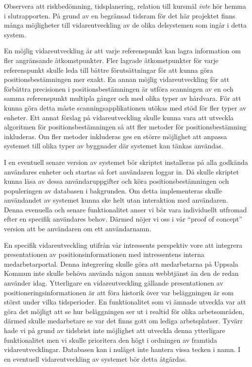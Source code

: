\documentclass[a4paper,12pt]{article}
\begin{document}
Observera att risk\-be\-döm\-ning, tids\-planering, relation till kursmål \emph{inte} hör hemma i slutrapporten.
\fi
På grund av en begränsad tidsram för det här projektet finns många möjligheter till vidareutveckling av de olika delsystemen som ingår i detta system.

En möjlig vidareutveckling är att varje referenspunkt kan lagra information om fler angränsande åtkomstpunkter. Fler lagrade åtkomstpunkter för varje referenspunkt skulle leda till bättre förutsättningar för att kunna göra positionsbestämningen mer exakt. En annan möjlig vidareutveckling för att förbättra precisionen i positionsbestämningen är utföra scanningen av en och samma referenspunkt multipla gånger och med olika typer av hårdvara. För att kunna göra detta måste scanningsapplikationen utökas med stöd för fler typer av enheter. Ett annat förslag på vidareutveckling skulle kunna vara att utveckla algoritmen för positionsbestämningen så att fler metoder för positionsbestämning inkluderas. Om fler metoder inkluderas ges en större möjlighet att anpassa systemet till olika typer av byggnader där systemet kan tänkas användas.

I en eventuell senare version av systemet bör skriptet installeras på alla godkända användares enheter och startas så fort användaren loggar in. Då skulle  skriptet kunna läsa av dessa användaruppgifter och köra positionsbestämningen och populeringen av databasen i bakgrunden. Om detta implementeras skulle användandet av systemet kunna ske helt utan interaktion med användaren. Denna evenuella och senare funktionalitet anser vi bör vara individuellt utfromad efter en specifik användares behov. Därmed nöjer vi oss i vår ``proof of concept'' version att be användaren om ett användarnamn.

En specifik vidareutveckling utifrån vår intressents perspektiv vore att integrera presentationen av positionsinformationen med intressentens interna medarbetarportal. Denna integrering skulle göra att medarbetarna på Uppsala Kommun inte skulle behöva använda någon annan webbtjänst än den de redan använder idag.
Ytterligare en vidareutveckling gällande presentationen av positioneringsinformationen är att föra historik över var beläggningen är som störst under vilka tidsperioder. En funktionalitet som vi ämnade utveckla var att göra det möjligt att se hur beläggningen ser ut i realtid för olika arbetsområden, därmed skulle medarbetare se var det finns gott om lediga arbetsplatser. Tyvärr hade vi på grund av tidsbrist inte möjlighet att utveckla denna ytterligare funktionalitet men vi skulle prioritera den högt i ordningen av framtida vidareutvecklingar.
Databasen kan i nuläget inte hantera vissa tecken i namn. I en eventuell vidareutveckling av systemet bör detta åtgärdas.
\end{document}

